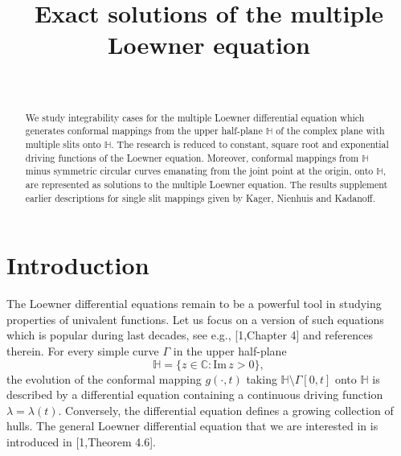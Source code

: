 \documentclass[
11pt,%
tightenlines,%
twoside,%
onecolumn,%
nofloats,%
nobibnotes,%
nofootinbib,%
superscriptaddress,%
noshowpacs,%
centertags]%
{revtex4}
\begin{document}

\title{Exact solutions of the multiple Loewner equation}

\author{~}
 




\begin{abstract}
We study integrability cases for the multiple Loewner differential equation which generates conformal mappings from the upper half-plane $\mathbb H$ of the complex plane with multiple slits onto $\mathbb H$. The research is reduced to constant, square root and exponential driving functions of the Loewner equation. Moreover, conformal mappings from $\mathbb H$ minus symmetric circular curves emanating from the joint point at the origin, onto $\mathbb H$, are represented as solutions to the multiple Loewner equation. The results supplement earlier descriptions for single slit mappings given by Kager, Nienhuis and Kadanoff.
\end{abstract}


\maketitle

\section{Introduction}

The Loewner differential equations remain to be a powerful tool in studying properties of univalent functions. Let us focus on a version of such equations which is popular during last decades, see e.g., [1,Chapter 4] and references therein. For every simple curve $\Gamma$ in the upper half-plane $$\mathbb H=\{z\in\mathbb C:\text{Im}\,z>0\},$$ the evolution of the conformal mapping $g(\cdot,t)$ taking $\mathbb H\setminus\Gamma[0,t]$ onto $\mathbb H$ is described by a differential equation containing a continuous driving function $\lambda=\lambda(t)$. Conversely, the differential equation defines a growing collection of hulls. The general Loewner differential equation that we are interested in is introduced in [1,Theorem 4.6].
\end{document}
